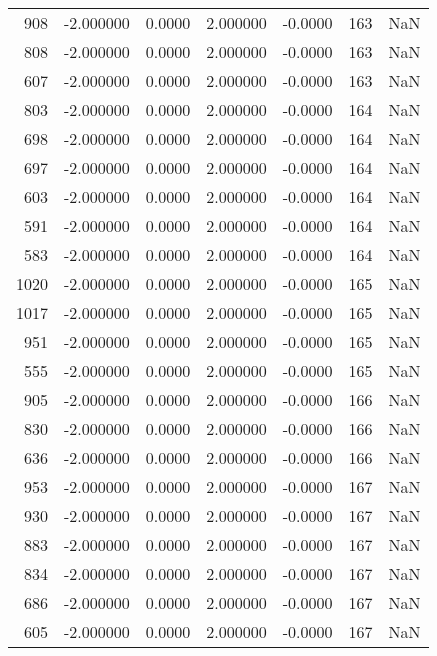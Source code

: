 \begin{tabular}{rrrrrrr}
 908 &   -2.000000 &    0.0000 &    2.000000 &     -0.0000 &         163 & NaN \\
 808 &   -2.000000 &    0.0000 &    2.000000 &     -0.0000 &         163 & NaN \\
 607 &   -2.000000 &    0.0000 &    2.000000 &     -0.0000 &         163 & NaN \\
 803 &   -2.000000 &    0.0000 &    2.000000 &     -0.0000 &         164 & NaN \\
 698 &   -2.000000 &    0.0000 &    2.000000 &     -0.0000 &         164 & NaN \\
 697 &   -2.000000 &    0.0000 &    2.000000 &     -0.0000 &         164 & NaN \\
 603 &   -2.000000 &    0.0000 &    2.000000 &     -0.0000 &         164 & NaN \\
 591 &   -2.000000 &    0.0000 &    2.000000 &     -0.0000 &         164 & NaN \\
 583 &   -2.000000 &    0.0000 &    2.000000 &     -0.0000 &         164 & NaN \\
1020 &   -2.000000 &    0.0000 &    2.000000 &     -0.0000 &         165 & NaN \\
1017 &   -2.000000 &    0.0000 &    2.000000 &     -0.0000 &         165 & NaN \\
 951 &   -2.000000 &    0.0000 &    2.000000 &     -0.0000 &         165 & NaN \\
 555 &   -2.000000 &    0.0000 &    2.000000 &     -0.0000 &         165 & NaN \\
 905 &   -2.000000 &    0.0000 &    2.000000 &     -0.0000 &         166 & NaN \\
 830 &   -2.000000 &    0.0000 &    2.000000 &     -0.0000 &         166 & NaN \\
 636 &   -2.000000 &    0.0000 &    2.000000 &     -0.0000 &         166 & NaN \\
 953 &   -2.000000 &    0.0000 &    2.000000 &     -0.0000 &         167 & NaN \\
 930 &   -2.000000 &    0.0000 &    2.000000 &     -0.0000 &         167 & NaN \\
 883 &   -2.000000 &    0.0000 &    2.000000 &     -0.0000 &         167 & NaN \\
 834 &   -2.000000 &    0.0000 &    2.000000 &     -0.0000 &         167 & NaN \\
 686 &   -2.000000 &    0.0000 &    2.000000 &     -0.0000 &         167 & NaN \\
 605 &   -2.000000 &    0.0000 &    2.000000 &     -0.0000 &         167 & NaN \\

\end{tabular}
